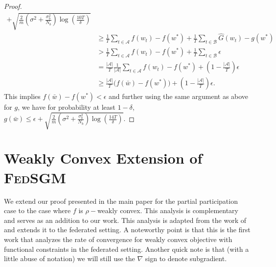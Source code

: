 \documentclass{article} %
\def\A{{\mathcal A}}
\def\B{{\mathcal B}}
\begin{document}
\begin{proof}
\begin{equation}
\begin{aligned}
            + \sqrt{\frac{2}{m}\left({\sigma^2} + \frac{\sigma^2_b}{N_b}\right) \log\left(\frac{10T}{\delta}\right)} 
            \\
            &\geq \frac{1}{T} \sum_{t\in \A} f(w_t)-f(w^*) +\frac{1}{T} \sum_{t\in \B} \hat{G}(w_t)-g(w^*)
            \\
            &>\frac{1}{T} \sum_{t\in \A} f(w_t)-f(w^*) +\frac{1}{T} \sum_{t\in \B} \epsilon\\&=\frac{|\A|}{T}  \frac{1}{|\A|}\sum_{t\in \A} f(w_t)-f(w^*) +(1-\frac{|\A|}{T}) \epsilon\\&\geq\frac{|\A|}{T} \big( f(\bar{w})-f(w^*) \big)+(1-\frac{|\A|}{T}) \epsilon .
        \end{aligned}
    \end{equation}
    This implies $f(\bar{w})-f(w^*)<\epsilon$ and further using the same argument as above for $g$, we have for probability at least $1-\delta$, $g(\bar{w}) \leq \epsilon + \sqrt{\frac{2}{m}\left({\sigma^2} + \frac{\sigma^2_b}{N_b}\right) \log\left(\frac{14T}{\delta}\right)}.$
\end{proof}
\section{Weakly Convex Extension of \textsc{FedSGM}}
We extend our proof presented in the main paper for the partial participation case to the case where $f$ is $\rho-$weakly convex. This analysis is complementary and serves as an addition to our work. This analysis is adapted from the work of \citet{huang2023oracle} and extends it to the federated setting. A noteworthy point is that this is the first work that analyzes the rate of convergence for weakly convex objective with functional constraints in the federated setting. Another quick note is that (with a little abuse of notation) we will still use the $\nabla$ sign to denote subgradient. 
\end{document}
